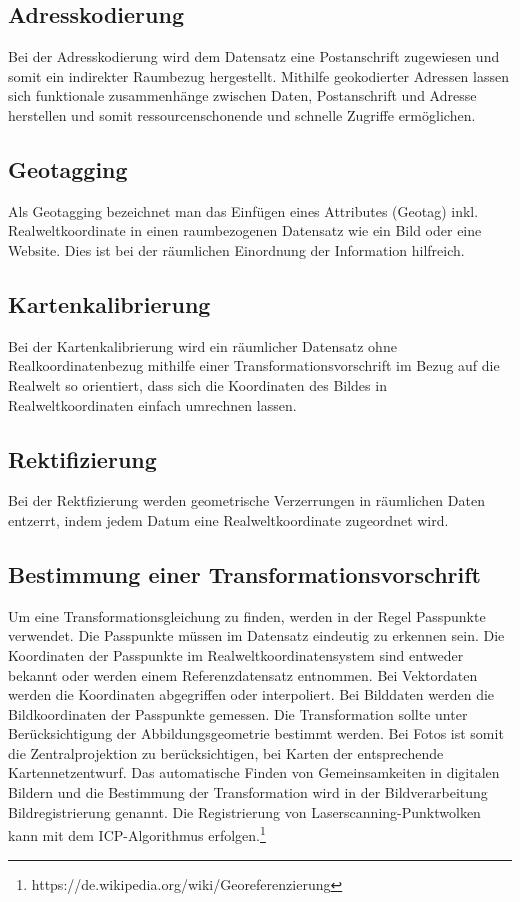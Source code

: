 \documentclass[11pt,fleqn]{book}
\begin{document}
\subsection{Adresskodierung}
Bei der Adresskodierung wird dem Datensatz eine Postanschrift zugewiesen und somit ein indirekter Raumbezug hergestellt. Mithilfe geokodierter Adressen lassen sich funktionale zusammenhänge zwischen Daten, Postanschrift und Adresse herstellen und somit ressourcenschonende und schnelle Zugriffe ermöglichen.
\subsection{Geotagging}
Als Geotagging bezeichnet man das Einfügen eines Attributes (Geotag) inkl. Realweltkoordinate in einen raumbezogenen Datensatz wie ein Bild oder eine Website. Dies ist bei der räumlichen Einordnung der Information hilfreich.
\subsection{Kartenkalibrierung}
Bei der Kartenkalibrierung wird ein räumlicher Datensatz ohne Realkoordinatenbezug mithilfe einer Transformationsvorschrift im Bezug auf die Realwelt so orientiert, dass sich die Koordinaten des Bildes in Realweltkoordinaten einfach umrechnen lassen.
\subsection{Rektifizierung}
Bei der Rektfizierung werden geometrische Verzerrungen in räumlichen Daten entzerrt, indem jedem Datum eine Realweltkoordinate zugeordnet wird.


\subsection{Bestimmung einer Transformationsvorschrift}

Um eine Transformationsgleichung zu finden, werden in der Regel Passpunkte verwendet. Die Passpunkte müssen im Datensatz eindeutig zu erkennen sein. Die Koordinaten der Passpunkte im Realweltkoordinatensystem sind entweder bekannt oder werden einem Referenzdatensatz entnommen. Bei Vektordaten werden die Koordinaten abgegriffen oder interpoliert. Bei Bilddaten werden die Bildkoordinaten der Passpunkte gemessen. Die Transformation sollte unter Berücksichtigung der Abbildungsgeometrie bestimmt werden. Bei Fotos ist somit die Zentralprojektion zu berücksichtigen, bei Karten der entsprechende Kartennetzentwurf. Das automatische Finden von Gemeinsamkeiten in digitalen Bildern und die Bestimmung der Transformation wird in der Bildverarbeitung Bildregistrierung genannt. Die Registrierung von Laserscanning-Punktwolken kann mit dem ICP-Algorithmus erfolgen.\footnote{https://de.wikipedia.org/wiki/Georeferenzierung}
\end{document}

